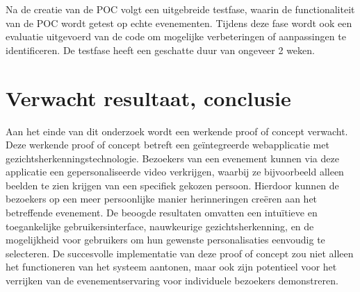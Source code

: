 Na de creatie van de POC volgt een uitgebreide testfase, waarin de functionaliteit van de POC wordt getest op echte evenementen. Tijdens deze fase wordt ook een evaluatie uitgevoerd van de code om mogelijke verbeteringen of aanpassingen te identificeren. De testfase heeft een geschatte duur van ongeveer 2 weken.

\section{Verwacht resultaat, conclusie}%
\label{sec:verwachte_resultaten}
Aan het einde van dit onderzoek wordt een werkende proof of concept verwacht. Deze werkende proof of concept betreft een geïntegreerde webapplicatie met gezichtsherkenningstechnologie. Bezoekers van een evenement kunnen via deze applicatie een gepersonaliseerde video verkrijgen, waarbij ze bijvoorbeeld alleen beelden te zien krijgen van een specifiek gekozen persoon. Hierdoor kunnen de bezoekers op een meer persoonlijke manier herinneringen creëren aan het betreffende evenement. De beoogde resultaten omvatten een intuïtieve en toegankelijke gebruikersinterface, nauwkeurige gezichtsherkenning, en de mogelijkheid voor gebruikers om hun gewenste personalisaties eenvoudig te selecteren. De succesvolle implementatie van deze proof of concept zou niet alleen het functioneren van het systeem aantonen, maar ook zijn potentieel voor het verrijken van de evenementservaring voor individuele bezoekers demonstreren.

